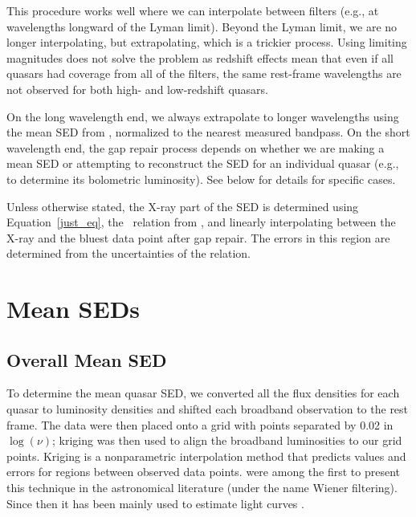 This procedure works well where we can interpolate between filters (e.g., at wavelengths longward of the Lyman limit).  Beyond the Lyman limit, we are no longer interpolating, but extrapolating, which is a trickier process.  Using limiting magnitudes does not solve the problem as redshift effects mean that even if all quasars had coverage from all of the filters, the same rest-frame wavelengths are not observed for both high- and  low-redshift quasars.

On the long wavelength end, we always extrapolate to longer wavelengths using the mean SED from \citet{Richards:2006}, normalized to the nearest measured bandpass.  On the short wavelength end, the gap repair process depends on whether we are making a mean SED or attempting to reconstruct the SED for an individual quasar (e.g., to determine its bolometric luminosity).  See below for details for specific cases.

Unless otherwise stated, the X-ray part of the SED is determined using Equation~\ref{just_eq}, the \luvaox\ relation from \citet{Steffen:2006}, and linearly interpolating between the X-ray and the bluest data point after gap repair. The errors in this region are determined from the uncertainties of the \citet{Steffen:2006}  relation.

\section{Mean SEDs} \label{sed}

\subsection{Overall Mean SED}
To determine the mean quasar SED, we converted all the flux densities for each quasar to luminosity densities and shifted each broadband observation to the rest frame.  The data were then placed onto a grid with points separated by 0.02 in $\log{(\nu)}$; 
kriging was then used to align the broadband luminosities to our grid points.  Kriging is a nonparametric interpolation method that predicts values and errors for regions between observed data points.  \citet{Rybicki:1992} were among the first to present this technique in the astronomical literature (under the name Wiener filtering).  Since then it has been mainly used to estimate light curves \citep[e.g.,][]{Kozowski:2010}.

